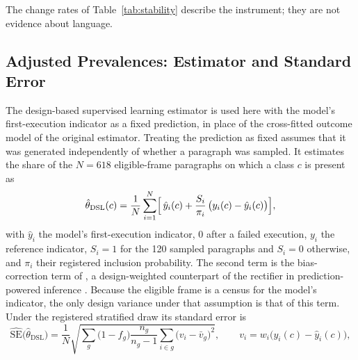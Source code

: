

The change rates of Table~\ref{tab:stability} describe the instrument; they are not evidence about language.





\subsection{Adjusted Prevalences: Estimator and Standard Error}\label{app:dsl_details}

The design-based supervised learning estimator \parencite{egami2023dsl} is used here with the model's first-execution indicator as a fixed prediction, in place of the cross-fitted outcome model of the original estimator. Treating the prediction as fixed assumes that it was generated independently of whether a paragraph was sampled. It estimates the share of the $N = 618$ eligible-frame paragraphs on which a class $c$ is present as
\begin{equation}
\hat{\theta}_{\mathrm{DSL}}(c) = \frac{1}{N} \sum_{i=1}^{N} \Bigl[\, \hat{y}_i(c) + \frac{S_i}{\pi_i}\,\bigl(y_i(c) - \hat{y}_i(c)\bigr) \Bigr],
\label{eq:dsl_estimator}
\end{equation}
with $\hat{y}_i$ the model's first-execution indicator, 0 after a failed execution, $y_i$ the reference indicator, $S_i = 1$ for the 120 sampled paragraphs and $S_i = 0$ otherwise, and $\pi_i$ their registered inclusion probability. The second term is the bias-correction term of \textcite{egami2023dsl}, a design-weighted counterpart of the rectifier in prediction-powered inference \parencite[p.~669]{angelopoulos2023ppi}. Because the eligible frame is a census for the model's indicator, the only design variance under that assumption is that of this term. Under the registered stratified draw its standard error is
\begin{equation}
\widehat{\mathrm{SE}}\bigl(\hat{\theta}_{\mathrm{DSL}}\bigr) = \frac{1}{N} \sqrt{\sum_{g} \bigl(1 - f_g\bigr) \frac{n_g}{n_g - 1} \sum_{i \in g} \bigl(v_i - \bar{v}_g\bigr)^2 }, \qquad v_i = w_i \bigl(y_i(c) - \hat{y}_i(c)\bigr),
\label{eq:dsl_se}
\end{equation}
